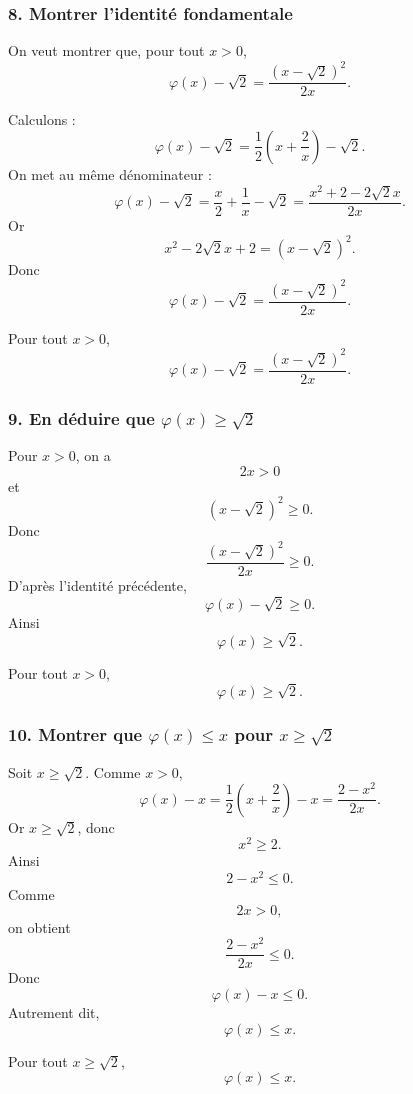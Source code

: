 \documentclass[11pt,a4paper]{article}
\begin{document}

\subsubsection*{8. Montrer l'identité fondamentale}

On veut montrer que, pour tout \(x>0\),
\[
\varphi(x)-\sqrt2
=
\frac{(x-\sqrt2)^2}{2x}.
\]

Calculons :
\[
\varphi(x)-\sqrt2
=
\frac12\left(x+\frac2x\right)-\sqrt2.
\]
On met au même dénominateur :
\[
\varphi(x)-\sqrt2
=
\frac{x}{2}+\frac1x-\sqrt2
=
\frac{x^2+2-2\sqrt2 x}{2x}.
\]
Or
\[
x^2-2\sqrt2 x+2=(x-\sqrt2)^2.
\]
Donc
\[
\varphi(x)-\sqrt2
=
\frac{(x-\sqrt2)^2}{2x}.
\]

\begin{resultatbox}
Pour tout \(x>0\),
\[
\varphi(x)-\sqrt2
=
\frac{(x-\sqrt2)^2}{2x}.
\]
\end{resultatbox}


\subsubsection*{9. En déduire que \(\varphi(x)\geq\sqrt2\)}

Pour \(x>0\), on a
\[
2x>0
\]
et
\[
(x-\sqrt2)^2\geq 0.
\]
Donc
\[
\frac{(x-\sqrt2)^2}{2x}\geq 0.
\]
D'après l'identité précédente,
\[
\varphi(x)-\sqrt2\geq 0.
\]
Ainsi
\[
\varphi(x)\geq \sqrt2.
\]

\begin{resultatbox}
Pour tout \(x>0\),
\[
\varphi(x)\geq \sqrt2.
\]
\end{resultatbox}


\subsubsection*{10. Montrer que \(\varphi(x)\leq x\) pour \(x\geq\sqrt2\)}

Soit \(x\geq\sqrt2\). Comme \(x>0\),
\[
\varphi(x)-x
=
\frac12\left(x+\frac2x\right)-x
=
\frac{2-x^2}{2x}.
\]
Or \(x\geq\sqrt2\), donc
\[
x^2\geq 2.
\]
Ainsi
\[
2-x^2\leq 0.
\]
Comme
\[
2x>0,
\]
on obtient
\[
\frac{2-x^2}{2x}\leq 0.
\]
Donc
\[
\varphi(x)-x\leq 0.
\]
Autrement dit,
\[
\varphi(x)\leq x.
\]

\begin{resultatbox}
Pour tout \(x\geq\sqrt2\),
\[
\varphi(x)\leq x.
\]
\end{resultatbox}
\end{document}
